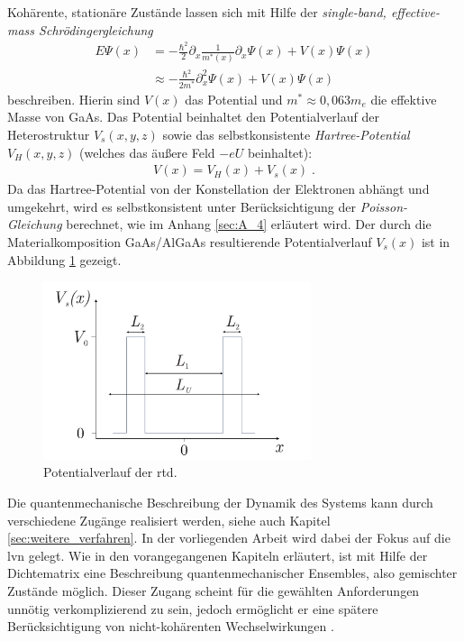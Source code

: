 Kohärente, stationäre Zustände lassen sich mit Hilfe der \emph{single-band, effective-mass Schrödingergleichung} \cite{frensley3}
\begin{equation}
  \begin{aligned}
    E\Psi(x) &= -\frac{\hbar^2}{2}\partial_x \frac{1}{m^*(x)}\partial_x\Psi(x) + V(x)\Psi(x)    \\
    &\approx -\frac{\hbar^2}{2m^*}\partial_x^2\Psi(x) + V(x)\Psi(x)
  \end{aligned}
  \label{eq:schroedinger}
\end{equation}
beschreiben. Hierin sind $V(x)$ das Potential und $m^*\approx 0,063m_e$ die effektive Masse von GaAs. Das Potential beinhaltet den Potentialverlauf der Heterostruktur $V_s(x,y,z)$ sowie das selbstkonsistente \emph{Hartree-Potential} $V_H(x,y,z)$ (welches das äußere Feld $-eU$ beinhaltet):
\begin{align}
  V({x}) = V_H({x}) + V_s({x}) \; .
  \label{eq:potentialgesamt}
\end{align}
Da das Hartree-Potential von der Konstellation der Elektronen abhängt und umgekehrt, wird es selbstkonsistent unter Berücksichtigung der \emph{Poisson-Gleichung} berechnet, wie im Anhang \ref{sec:A_4} erläutert wird.
Der durch die Materialkomposition GaAs/AlGaAs resultierende Potentialverlauf $V_s(x)$ ist in Abbildung \ref{fig:pot1} gezeigt.
\begin{figure}
  \centering
  \includegraphics[width=0.7\textwidth]{files/potential.pdf}
  \caption{Potentialverlauf der \ac{rtd}.}
  \label{fig:pot1}
\end{figure}

Die quantenmechanische Beschreibung der Dynamik des Systems kann durch verschiedene Zugänge realisiert werden, siehe auch Kapitel \ref{sec:weitere_verfahren}. In der vorliegenden Arbeit wird dabei der Fokus auf die \ac{lvn} gelegt. Wie in den vorangegangenen Kapiteln erläutert, ist mit Hilfe der Dichtematrix eine Beschreibung quantenmechanischer Ensembles, also gemischter Zustände möglich. Dieser Zugang scheint für die gewählten Anforderungen unnötig verkomplizierend zu sein, jedoch ermöglicht er eine spätere Berücksichtigung von nicht-kohärenten Wechselwirkungen \cite{wiedenhaus}.



